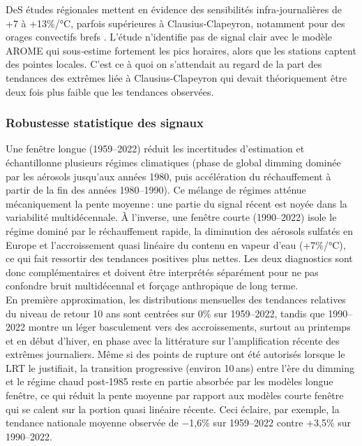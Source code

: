 \documentclass[
  article,
  nofooter,
  noheadings]{jss}
\begin{document}
DeS études régionales mettent en évidence des sensibilités
infra‑journalières de +7 à +13\%/°C, parfois supérieures à
Clausius‑Clapeyron, notamment pour des orages convectifs brefs
\citep{molnar2015relation}. L'étude n'identifie pas de signal clair avec
le modèle AROME qui sous‑estime fortement les pics horaires, alors que
les stations captent des pointes locales. C'est ce à quoi on s'attendait
au regard de la part des tendances des extrêmes liée à
Clausius-Clapeyron qui devait théoriquement être deux fois plus faible
que les tendances observées.

\subsubsection{Robustesse statistique des
signaux}\label{robustesse-statistique-des-signaux}

Une fenêtre longue (1959--2022) réduit les incertitudes d'estimation et
échantillonne plusieurs régimes climatiques (phase de global dimming
dominée par les aérosols jusqu'aux années 1980, puis accélération du
réchauffement à partir de la fin des années 1980--1990). Ce mélange de
régimes atténue mécaniquement la pente moyenne\,: une partie du signal
récent est noyée dans la variabilité multidécennale. À l'inverse, une
fenêtre courte (1990--2022) isole le régime dominé par le réchauffement
rapide, la diminution des aérosols sulfatés en Europe et l'accroissement
quasi linéaire du contenu en vapeur d'eau (+7\%/°C), ce qui fait
ressortir des tendances positives plus nettes. Les deux diagnostics sont
donc complémentaires et doivent être interprétés séparément pour ne pas
confondre bruit multidécennal et forçage anthropique de long terme.\\

En première approximation, les distributions mensuelles des tendances
relatives du niveau de retour 10 ans sont centrées sur 0\% sur
1959--2022, tandis que 1990--2022 montre un léger basculement vers des
accroissements, surtout au printemps et en début d'hiver, en phase avec
la littérature sur l'amplification récente des extrêmes journaliers.
Même si des points de rupture ont été autorisés lorsque le LRT le
justifiait, la transition progressive (environ 10\,ans) entre l'ère du
dimming et le régime chaud post‑1985 reste en partie absorbée par les
modèles longue fenêtre, ce qui réduit la pente moyenne par rapport aux
modèles courte fenêtre qui se calent sur la portion quasi linéaire
récente. Ceci éclaire, par exemple, la tendance nationale moyenne
observée de −1,6\% sur 1959--2022 contre +3,5\% sur 1990--2022.\\
\end{document}
